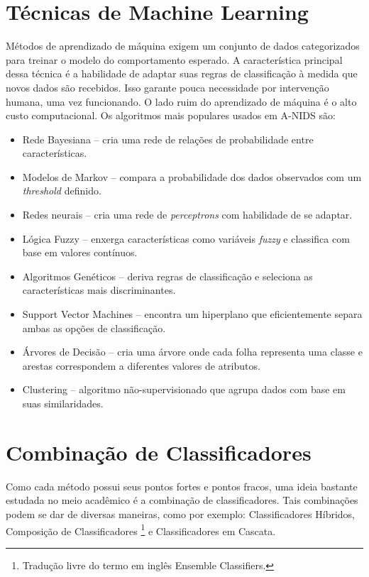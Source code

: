 \section{Técnicas de Machine Learning}
 Métodos de aprendizado de máquina exigem um conjunto de dados categorizados para treinar o modelo do comportamento
 esperado. A característica principal dessa técnica é a habilidade de adaptar suas regras de classificação à medida que
 novos dados são recebidos. Isso garante pouca necessidade por intervenção humana, uma vez funcionando. O lado ruim
 do aprendizado de máquina é o alto custo computacional. Os algoritmos mais populares usados em A-NIDS são:
 \begin{itemize}
    \item Rede Bayesiana -- cria uma rede de relações de probabilidade entre características.
    \item Modelos de Markov -- compara a probabilidade dos dados observados com um \emph{threshold} definido.
    \item Redes neurais -- cria uma rede de \emph{perceptrons} com habilidade de se adaptar.
    \item Lógica Fuzzy -- enxerga características como variáveis \emph{fuzzy} e classifica com base em valores contínuos.
    \item Algoritmos Genéticos -- deriva regras de classificação e seleciona as características mais discriminantes.
    \item Support Vector Machines -- encontra um hiperplano que eficientemente separa ambas as opções de classificação.
    \item Árvores de Decisão -- cria uma árvore onde cada folha representa uma classe e arestas correspondem a
        diferentes valores de atributos.
    \item Clustering -- algoritmo não-supervisionado que agrupa dados com base em suas similaridades.
\end{itemize}

\section{Combinação de Classificadores}
Como cada método possui seus pontos fortes e pontos fracos, uma ideia bastante estudada no meio acadêmico é a
 combinação de classificadores. Tais combinações podem se dar de diversas maneiras, como por exemplo: Classificadores
 Híbridos, Composição de Classificadores \footnote{Tradução livre do termo em inglês Ensemble Classifiers.} e
 Classificadores em Cascata.

